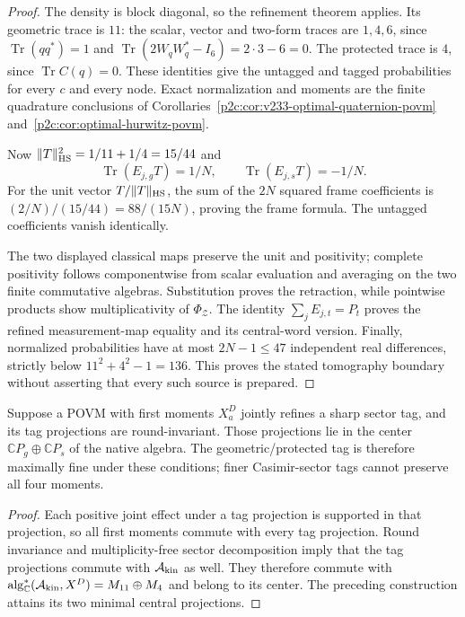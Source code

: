 \documentclass[12pt,a4paper]{article}
\begin{document}
\begin{proof}
The density is block diagonal, so the refinement theorem applies.  Its
geometric trace is $11$: the scalar, vector and two-form traces are
$1,4,6$, since $\operatorname{Tr}(qq^*)=1$ and
$\operatorname{Tr}(2W_qW_q^*-I_6)=2\cdot3-6=0$.
The protected trace is $4$, since $\operatorname{Tr}C(q)=0$.
These identities give the untagged and tagged probabilities for every
$c$ and every node.  Exact normalization and moments are the finite
quadrature conclusions of
Corollaries~\ref{p2c:cor:v233-optimal-quaternion-povm}
and~\ref{p2c:cor:optimal-hurwitz-povm}.

Now $\|T\|_{\rm HS}^2=1/11+1/4=15/44$ and
\[
 \operatorname{Tr}(E_{j,g}T)=1/N,\qquad
 \operatorname{Tr}(E_{j,s}T)=-1/N.
\]
For the unit vector $T/\|T\|_{\rm HS}$, the sum of the $2N$ squared
frame coefficients is $(2/N)/(15/44)=88/(15N)$, proving the frame
formula.  The untagged coefficients vanish identically.

The two displayed classical maps preserve the unit and positivity;
complete positivity follows componentwise from scalar evaluation and
averaging on the two finite commutative algebras.  Substitution proves
the retraction, while pointwise products show multiplicativity of
$\Phi_{\mathcal Z}$.  The identity $\sum_jE_{j,t}=P_t$ proves the
refined measurement-map equality and its central-word version.  Finally,
normalized probabilities have at most $2N-1\le47$ independent real
differences, strictly below $11^2+4^2-1=136$.  This proves the stated
tomography boundary without asserting that every such source is prepared.
\end{proof}

\begin{corollary}
\label{p2c:cor:maximal-native-sharp-tag}
Suppose a POVM with first moments $X_a^D$ jointly refines a sharp sector
tag, and its tag projections are round-invariant.  Those projections lie
in the center $\mathbb CP_g\oplus\mathbb CP_s$ of the native algebra.
The geometric/protected tag is therefore maximally fine under these
conditions; finer Casimir-sector tags cannot preserve all four moments.
\end{corollary}
\begin{proof}
Each positive joint effect under a tag projection is supported in that
projection, so all first moments commute with every tag projection.
Round invariance and multiplicity-free sector decomposition imply that
the tag projections commute with $\mathcal A_{\rm kin}$ as well.
They therefore commute with
$\operatorname{alg}_{\mathbb C}^*(\mathcal A_{\rm kin},X^D)=M_{11}\oplus M_4$
and belong to its center.  The preceding construction attains its two
minimal central projections.
\end{proof}
\end{document}
